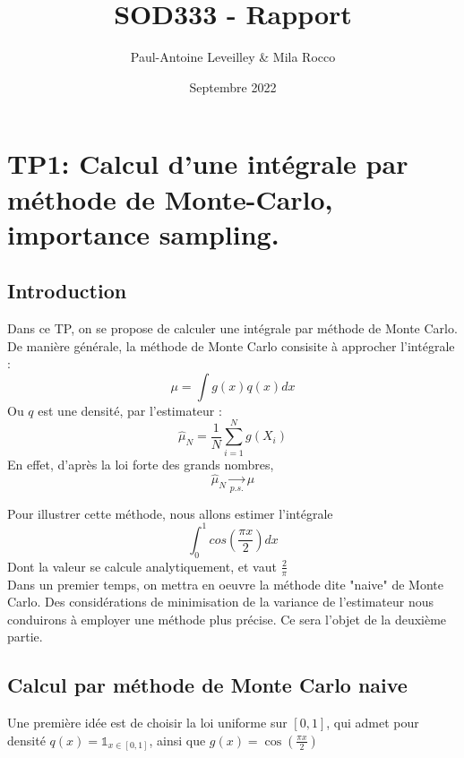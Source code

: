 \documentclass{article}
\title{SOD333 - Rapport}
\author{Paul-Antoine Leveilley \& Mila Rocco}
\date{Septembre 2022}
\begin{document}
\maketitle

\newpage
\tableofcontents
\newpage







\newpage
\section{TP1: Calcul d'une intégrale par méthode de Monte-Carlo, importance sampling.}
\subsection{Introduction}
Dans ce TP, on se propose de calculer une intégrale par méthode de Monte Carlo. De manière générale, la méthode de Monte Carlo
consisite à approcher l'intégrale : 
\[\mu = \int g(x)q(x)dx\] 
Ou $q$ est une densité, par l'estimateur : 
\begin{equation}
  \label{estim}
  \hat{\mu}_N = \frac{1}{N} \sum_{i=1}^N g(X_i)
\end{equation}
En effet, d'après la loi forte des grands nombres, 
\[\hat{\mu}_N\underset{p.s.}{\longrightarrow}\mu \] 

Pour illustrer cette méthode, nous allons estimer l'intégrale 
\[\int_0^1 cos(\frac{\pi x}{2})dx\]
Dont la valeur se calcule analytiquement, et vaut $\frac{2}{\pi}$ \\
Dans un premier temps, on mettra en oeuvre la méthode dite "naive" de Monte Carlo. Des considérations de minimisation de
la variance de l'estimateur nous conduirons à employer une méthode
plus précise. Ce sera l'objet de la deuxième partie.\\ 

 \subsection{Calcul par méthode de Monte Carlo naive}
Une première idée est de choisir la loi uniforme sur $[0,1]$, qui admet pour densité $q(x) = \mathbb{1}_{x \in [0,1]}$, ainsi que $g(x) = \cos (\frac{\pi x}{2})$
\end{document}
